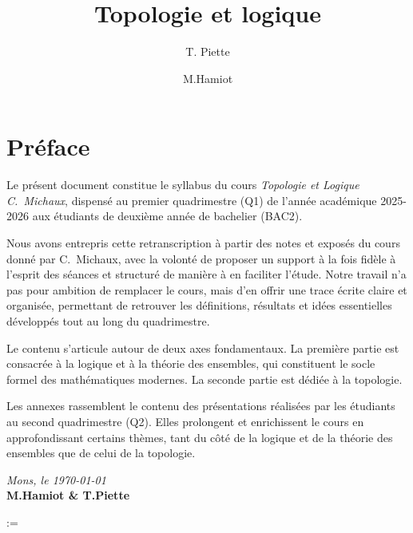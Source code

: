\documentclass[12pt,a4paper]{report}
\title{Topologie et    \: logique}
\author{T. Piette \and M.Hamiot}
\begin{document}




\chapter*{Préface}

Le présent document constitue le syllabus du cours \textit{Topologie et Logique C.~Michaux}, dispensé au premier quadrimestre (Q1) de l’année académique 2025-2026 aux étudiants de deuxième année de bachelier (BAC2).

\vspace{0.5em}

Nous avons entrepris cette retranscription à partir des notes et exposés du cours donné par C.~Michaux, avec la volonté de proposer un support à la fois fidèle à l’esprit des séances et structuré de manière à en faciliter l’étude. Notre travail n’a pas pour ambition de remplacer le cours, mais d’en offrir une trace écrite claire et organisée, permettant de retrouver les définitions, résultats et idées essentielles développés tout au long du quadrimestre.

\vspace{0.5em}

Le contenu s’articule autour de deux axes fondamentaux. La première partie est consacrée à la logique et à la théorie des ensembles, qui constituent le socle formel des mathématiques modernes. La seconde partie est dédiée à la topologie.

\vspace{0.5em}

Les annexes rassemblent le contenu des présentations réalisées par les étudiants au second quadrimestre (Q2). Elles prolongent et enrichissent le cours en approfondissant certains thèmes, tant du côté de la logique et de la théorie des ensembles que de celui de la topologie.

\vfill

\vspace{1.5cm}

\begin{flushright}
    \textit{Mons, le \today} \\
    \textbf{M.Hamiot \& T.Piette}
\end{flushright}

\newpage

\tableofcontents
\newpage







:=
\end{document}
